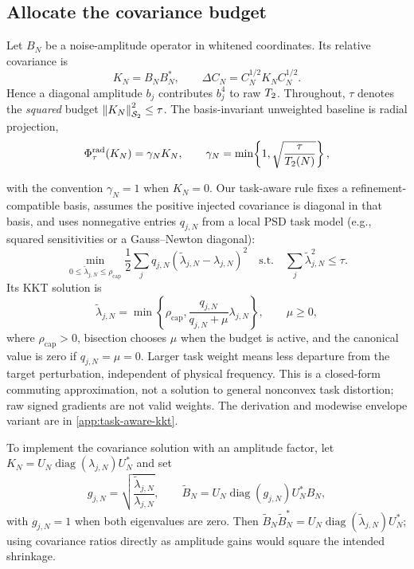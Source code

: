 \subsection{Allocate the covariance budget}
\label{sec:task-aware-budget}

Let $B_N$ be a noise-amplitude operator in whitened coordinates. Its relative
covariance is
\begin{equation}
  K_N=B_NB_N^\ast,\qquad
  \Delta C_N=C_N^{1/2}K_NC_N^{1/2}.
  \label{eq:amplitude-covariance-contract}
\end{equation}
Hence a diagonal amplitude $b_j$ contributes $b_j^4$ to raw $T_2$. Throughout,
$\tau$ denotes the \emph{squared} budget $\left\lVert K_N \right\rVert_{\mathcal{S}_{2}}^2\le\tau$.
The basis-invariant unweighted baseline is radial projection,
\begin{equation}
  \Phi_\tau^{\mathrm{rad}}(K_N)
  =\gamma_NK_N,\qquad
  \gamma_N=\min\!\left\{1,\sqrt{\frac{\tau}{T_2(N)}}\right\},
  \label{eq:s2-budget-gate}
\end{equation}

with the convention $\gamma_N=1$ when $K_N=0$. Our task-aware rule fixes a
refinement-compatible basis, assumes the positive
injected covariance is diagonal in that basis, and uses nonnegative entries
$q_{j,N}$ from a local PSD task model (e.g., squared sensitivities or a
Gauss--Newton diagonal):
\begin{equation}
  \min_{0\le\widetilde\lambda_{j,N}\le\rho_{\mathrm{cap}}}
  \frac12\sum_jq_{j,N}
    (\widetilde\lambda_{j,N}-\lambda_{j,N})^2
  \quad\text{s.t.}\quad
  \sum_j\widetilde\lambda_{j,N}^2\le\tau.
  \label{eq:task-aware-projection}
\end{equation}
Its KKT solution is
\begin{equation}
  \widetilde\lambda_{j,N}
  =\min\!\left\{\rho_{\mathrm{cap}},
    \frac{q_{j,N}}{q_{j,N}+\mu}\lambda_{j,N}\right\},
  \qquad \mu\ge0,
  \label{eq:task-aware-kkt}
\end{equation}
where $\rho_{\mathrm{cap}}>0$, bisection chooses $\mu$ when the budget is
active, and the canonical value is zero if $q_{j,N}=\mu=0$. Larger task weight
means less departure from the target perturbation, independent of physical
frequency. This is a closed-form commuting approximation, not a solution to
general nonconvex task distortion; raw signed gradients are not valid weights.
The derivation and modewise envelope variant are in
\cref{app:task-aware-kkt}.

To implement the covariance solution with an amplitude factor, let
$K_N=U_N\operatorname{diag}(\lambda_{j,N})U_N^\ast$ and set
\begin{equation}
  g_{j,N}
  =\sqrt{\frac{\widetilde\lambda_{j,N}}{\lambda_{j,N}}},
  \qquad
  \widetilde B_N
  =U_N\operatorname{diag}(g_{j,N})U_N^\ast B_N,
  \label{eq:covariance-to-amplitude-gate}
\end{equation}
with $g_{j,N}=1$ when both eigenvalues are zero. Then
$\widetilde B_N\widetilde B_N^\ast
=U_N\operatorname{diag}(\widetilde\lambda_{j,N})U_N^\ast$; using covariance
ratios directly as amplitude gains would square the intended shrinkage.

